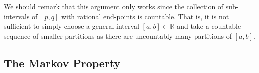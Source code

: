 \documentclass[a4paper,11pt]{article}
\theoremstyle{plain}
\theoremstyle{definition}
\begin{document}

We should remark that this argument only works since the collection of sub-intervals of $[p,q]$ with rational end-points is countable. That is, it is not sufficient to simply choose a general interval $[a,b] \subset \mathbb{R}$ and take a countable sequence of smaller partitions as there are uncountably many partitions of $[a,b]$.


\subsection{The Markov Property}
\end{document}

